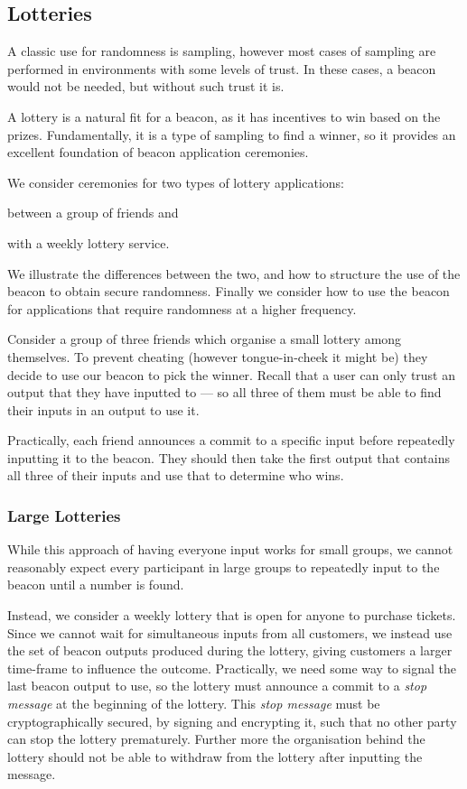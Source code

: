 \subsection{Lotteries}
A classic use for randomness is sampling, however most cases of sampling are performed in environments with some levels of trust.
In these cases, a beacon would not be needed, but without such trust it is.

A lottery is a natural fit for a beacon, as it has incentives to win based on the prizes.
Fundamentally, it is a type of sampling to find a winner, so it provides an excellent foundation of beacon application ceremonies.

We consider ceremonies for two types of lottery applications:
\begin{eletterate*}
\item between a group of friends and
\item with a weekly lottery service.
\end{eletterate*}
We illustrate the differences between the two, and how to structure the use of the beacon to obtain secure randomness.
Finally we consider how to use the beacon for applications that require randomness at a higher frequency.

Consider a group of three friends which organise a small lottery among themselves.
To prevent cheating (however tongue-in-cheek it might be) they decide to use our beacon to pick the winner.
Recall that a user can only trust an output that they have inputted to --- so all three of them must be able to find their inputs in an output to use it.

Practically, each friend announces a commit to a specific input before repeatedly inputting it to the beacon.
They should then take the first output that contains all three of their inputs and use that to determine who wins.

\subsubsection{Large Lotteries}%
\label{ssub:large_lotteries}
While this approach of having everyone input works for small groups, we cannot reasonably expect every participant in large groups to repeatedly input to the beacon until a number is found.

Instead, we consider a weekly lottery that is open for anyone to purchase tickets.
Since we cannot wait for simultaneous inputs from all customers, we instead use the set of beacon outputs produced during the lottery, giving customers a larger time-frame to influence the outcome.
Practically, we need some way to signal the last beacon output to use, so the lottery must announce a commit to a \textit{stop message} at the beginning of the lottery.
This \textit{stop message} must be cryptographically secured, by signing and encrypting it, such that no other party can stop the lottery prematurely.
Further more the organisation behind the lottery should not be able to withdraw from the lottery after inputting the message.

